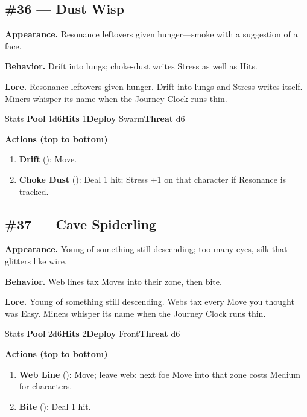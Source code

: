 \subsection*{\#36 --- Dust Wisp}

\textbf{Appearance.} Resonance leftovers given hunger---smoke with a suggestion of a face.

\textbf{Behavior.} Drift into lungs; choke-dust writes Stress as well as Hits.

\textbf{Lore.} Resonance leftovers given hunger. Drift into lungs and Stress writes itself. Miners whisper its name when the Journey Clock runs thin.

\begin{monsterentry}{Stats}
\textbf{Pool} 1d6\quad\textbf{Hits} 1\quad\textbf{Deploy} Swarm\quad\textbf{Threat} d6

\textbf{Actions (top to bottom)}
\begin{enumerate}\setlength{\itemsep}{0.15em}\setlength{\parskip}{0pt}
  \item \textbf{Drift} (\easy): Move.
  \item \textbf{Choke Dust} (\medium): Deal 1 hit; Stress +1 on that character if Resonance is tracked.
\end{enumerate}
\end{monsterentry}

\subsection*{\#37 --- Cave Spiderling}

\textbf{Appearance.} Young of something still descending; too many eyes, silk that glitters like wire.

\textbf{Behavior.} Web lines tax Moves into their zone, then bite.

\textbf{Lore.} Young of something still descending. Webs tax every Move you thought was Easy. Miners whisper its name when the Journey Clock runs thin.

\begin{monsterentry}{Stats}
\textbf{Pool} 2d6\quad\textbf{Hits} 2\quad\textbf{Deploy} Front\quad\textbf{Threat} d6

\textbf{Actions (top to bottom)}
\begin{enumerate}\setlength{\itemsep}{0.15em}\setlength{\parskip}{0pt}
  \item \textbf{Web Line} (\easy): Move; leave web: next foe Move into that zone costs Medium for characters.
  \item \textbf{Bite} (\medium): Deal 1 hit.
\end{enumerate}
\end{monsterentry}

